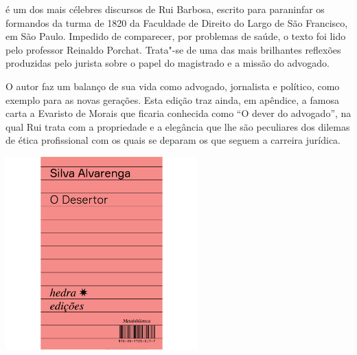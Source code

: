 \hspace*{-7cm}\hrulefill\hspace*{-7cm}

\medskip

 é um dos mais célebres discursos de Rui
Barbosa, escrito para paraninfar os formandos da
turma de 1820 da Faculdade de Direito do Largo de São Francisco, em São
Paulo. Impedido de comparecer,  por problemas de saúde, o texto foi
lido pelo professor Reinaldo Porchat. Trata"-se de uma das mais
brilhantes reflexões produzidas pelo jurista sobre o papel do
magistrado e a missão do advogado.

O autor faz um balanço de sua vida
como advogado, jornalista e político, como exemplo para as novas
gerações. Esta edição traz ainda, em apêndice, a famosa carta
a Evaristo de Morais que ficaria conhecida como ``O dever do advogado'',
na qual Rui trata com a propriedade e a elegância que lhe são peculiares
dos dilemas de ética profissional com os quais se deparam os que 
seguem a carreira jurídica. 

\vfill

\hspace*{-.4cm}\begin{minipage}[c]{.5\linewidth}
\small{
{}}
\end{minipage}

\pagebreak

\begin{center}
\hspace*{-3.6cm}
\hspace*{3.1cm}\includegraphics[width=74mm]{./grid/desertor.jpg}
\end{center}

